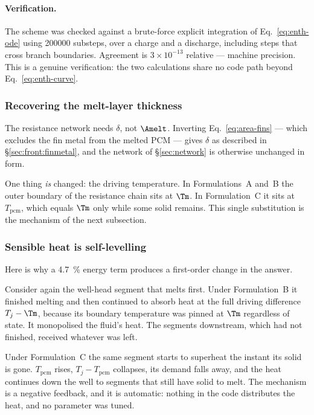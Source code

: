 \paragraph{Verification.}
The scheme was checked against a brute-force explicit integration of
Eq.~\eqref{eq:enth-ode} using \num{200000} substeps, over a charge and a
discharge, including steps that cross branch boundaries. Agreement is
$3\times10^{-13}$ relative --- machine precision. This is a genuine
verification: the two calculations share no code path beyond
Eq.~\eqref{eq:enth-curve}.

\subsubsection{Recovering the melt-layer thickness}

The resistance network needs $\delta$, not $\Amelt$. Inverting
Eq.~\eqref{eq:area-fins} --- which excludes the fin metal from the melted PCM
--- gives $\delta$ as described in \S\ref{sec:front:finmetal}, and the network
of \S\ref{sec:network} is otherwise unchanged in form.

One thing \emph{is} changed: the driving temperature. In Formulations~A and~B
the outer boundary of the resistance chain sits at $\Tm$. In Formulation~C it
sits at $T_{\mathrm{pcm}}$, which equals $\Tm$ only while some solid remains.
This single substitution is the mechanism of the next subsection.

\subsubsection{Sensible heat is self-levelling}
\label{sec:front:levelling}

Here is why a \SI{4.7}{\percent} energy term produces a first-order change in
the answer.

Consider again the well-head segment that melts first. Under Formulation~B it
finished melting and then continued to absorb heat at the full driving
difference $T_{j}-\Tm$, because its boundary temperature was pinned at $\Tm$
regardless of state. It monopolised the fluid's heat. The segments downstream,
which had not finished, received whatever was left.

Under Formulation~C the same segment starts to superheat the instant its solid
is gone. $T_{\mathrm{pcm}}$ rises, $T_{j}-T_{\mathrm{pcm}}$ collapses, its
demand falls away, and the heat continues down the well to segments that still
have solid to melt. The mechanism is a negative feedback, and it is automatic:
nothing in the code distributes the heat, and no parameter was tuned.


